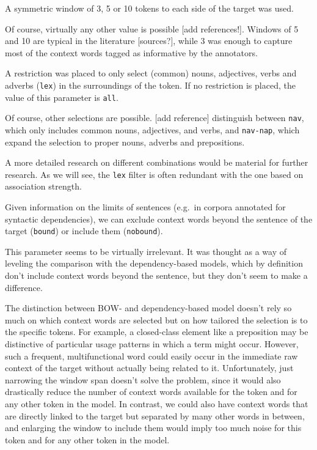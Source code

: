 \documentclass[
]{book}
\providecommand{\tightlist}{%
  \setlength{\itemsep}{0pt}\setlength{\parskip}{0pt}}
\begin{document}
\begin{description}
\tightlist
\item[\texttt{FOC-WIN} (first order window)]
A symmetric window of 3, 5 or 10 tokens to each side of the target was used.

Of course, virtually any other value is possible {[}add references!{]}. Windows of
5 and 10 are typical in the literature {[}sources?{]}, while 3 was enough to capture most
of the context words tagged as informative by the annotators.
\item[\texttt{FOC-POS} (first order part-of-speech)]
A restriction was placed to only select (common) nouns, adjectives, verbs and adverbs (\texttt{lex})
in the surroundings of the token. If no restriction is placed, the value of this parameter is \texttt{all}.

Of course, other selections are possible. {[}add reference{]} distinguish between
\texttt{nav}, which only includes common nouns, adjectives, and verbs, and \texttt{nav-nap}, which
expand the selection to proper nouns, adverbs and prepositions.

A more detailed research on different combinations would be material for further
research. As we will see, the \texttt{lex} filter is often redundant with the one based on
association strength.
\item[\texttt{BOUNDARIES}]
Given information on the limits of sentences (e.g.~in corpora annotated for
syntactic dependencies), we can exclude context words beyond the sentence of the target (\texttt{bound})
or include them (\texttt{nobound}).

This parameter seems to be virtually irrelevant. It was thought as a way of
leveling the comparison with the dependency-based models, which by definition don't
include context words beyond the sentence, but they don't seem to make a difference.
\end{description}

The distinction between BOW- and dependency-based model doesn't rely so much on
which context words are selected but on how tailored the selection is to the specific
tokens. For example, a closed-class element like a preposition may be distinctive
of particular usage patterns in which a term might occur. However, such a frequent,
multifunctional word could easily occur in the immediate raw context of the target
without actually being related to it. Unfortunately, just narrowing the window span
doesn't solve the problem, since it would also drastically reduce the number of
context words available for the token and for any other token in the model.
In contrast, we could also have context words that are directly linked to the target
but separated by many other words in between, and enlarging the window to include
them would imply too much noise for this token and for any other token in the model.
\end{document}

